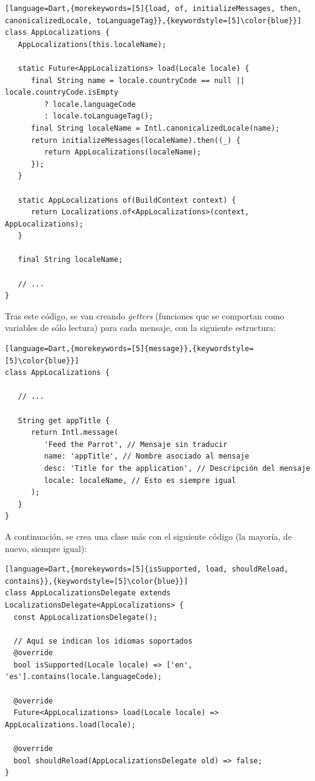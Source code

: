 \documentclass[11pt,spanish,listoffigures,listoftables,table,hyphens,dvipsnames]{tfgetsinf}
\begin{document}
\begin{lstlisting}[language=Dart,{morekeywords=[5]{load, of, initializeMessages, then, canonicalizedLocale, toLanguageTag}},{keywordstyle=[5]\color{blue}}]
class AppLocalizations {
   AppLocalizations(this.localeName);

   static Future<AppLocalizations> load(Locale locale) {
      final String name = locale.countryCode == null || locale.countryCode.isEmpty
         ? locale.languageCode
         : locale.toLanguageTag();
      final String localeName = Intl.canonicalizedLocale(name);
      return initializeMessages(localeName).then((_) {
         return AppLocalizations(localeName);
      });
   }

   static AppLocalizations of(BuildContext context) {
      return Localizations.of<AppLocalizations>(context, AppLocalizations);
   }

   final String localeName;

   // ...
}
\end{lstlisting}

Tras este código, se van creando \emph{getters} (funciones que se comportan como variables de sólo lectura) para cada mensaje, con la siguiente estructura:

\begin{lstlisting}[language=Dart,{morekeywords=[5]{message}},{keywordstyle=[5]\color{blue}}]
class AppLocalizations {

   // ...

   String get appTitle {
      return Intl.message(
         'Feed the Parrot', // Mensaje sin traducir
         name: 'appTitle', // Nombre asociado al mensaje
         desc: 'Title for the application', // Descripción del mensaje
         locale: localeName, // Esto es siempre igual
      );
   }
}
\end{lstlisting}

A continuación, se crea una clase más con el siguiente código (la mayoría, de nuevo, siempre igual):

\begin{lstlisting}[language=Dart,{morekeywords=[5]{isSupported, load, shouldReload, contains}},{keywordstyle=[5]\color{blue}}]
class AppLocalizationsDelegate extends LocalizationsDelegate<AppLocalizations> {
  const AppLocalizationsDelegate();

  // Aquí se indican los idiomas soportados
  @override
  bool isSupported(Locale locale) => ['en', 'es'].contains(locale.languageCode);

  @override
  Future<AppLocalizations> load(Locale locale) => AppLocalizations.load(locale);

  @override
  bool shouldReload(AppLocalizationsDelegate old) => false;
}
\end{lstlisting}
\end{document}
